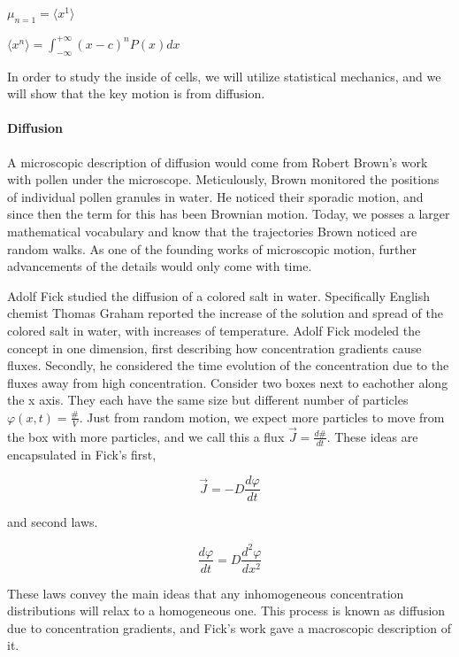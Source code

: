 \documentclass[a4paper,11pt,oneside]{book}
\begin{document}
$\mu_{n=1} = \langle x^1 \rangle$

$\langle x^n \rangle = \int_{ -\infty}^{+\infty} (x - c)^n P(x) dx$

In order to study the inside of cells, we will utilize statistical mechanics, and we will show that the key motion is from diffusion.

\paragraph{Diffusion}

A microscopic description of diffusion would come from Robert Brown's work with pollen under the microscope. Meticulously, Brown monitored the positions of individual pollen granules in water. He noticed their sporadic motion, and since then the term for this has been Brownian motion. Today, we posses a larger mathematical vocabulary and know that the trajectories Brown noticed are random walks. As one of the founding works of microscopic motion, further advancements of the details would only come with time.

Adolf Fick studied the diffusion of a colored salt in water. Specifically English chemist Thomas Graham reported the increase of the solution and spread of the colored salt in water, with increases of temperature. Adolf Fick modeled the concept in one dimension, first describing how concentration gradients cause fluxes. Secondly, he considered the time evolution of the concentration due to the fluxes away from high concentration. Consider two boxes next to eachother along the x axis. They each have the same size but different number of particles $\varphi(x, t) = \frac{\#}{V}$. Just from random motion, we expect more particles to move from the box with more particles, and we call this a flux $\vec{J} = \frac{d\#}{dt}$. These ideas are encapsulated in Fick's first,

\begin{equation}
\vec{J} = -D \frac{d\varphi}{dt}
\end{equation}

and second laws.

\begin{equation}
\frac{d\varphi}{dt} = D \frac{d^2\varphi}{dx^2}
\end{equation}

These laws convey the main ideas that any inhomogeneous concentration distributions will relax to a homogeneous one. This process is known as diffusion due to concentration gradients, and Fick's work gave a macroscopic description of it.
\end{document}
